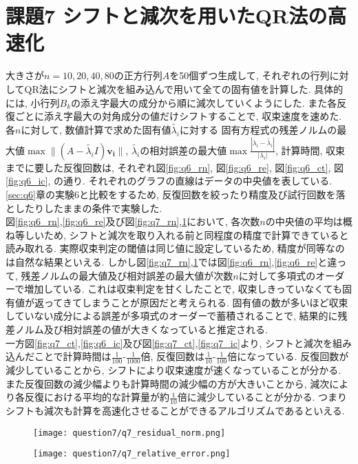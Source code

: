 \documentclass[uplatex,a4j]{jsarticle}
\begin{document}
\section{課題7 シフトと減次を用いたQR法の高速化}
\label{sec:q7}
大きさが$n = 10,20,40,80$の正方行列$A$を50個ずつ生成して, 
それぞれの行列に対してQR法にシフトと減次を組み込んで用いて全ての固有値を計算した. 
具体的には, 小行列$B_k$の添え字最大の成分から順に減次していくようにした. 
また各反復ごとに添え字最大の対角成分の値だけシフトすることで, 収束速度を速めた. \\
各$n$に対して, 数値計算で求めた固有値$\tilde{\lambda_i}$に対する
固有方程式の残差ノルムの最大値$\max{\| (A - \tilde{\lambda_i}I) \bm{v_i} \| }$, 
$\tilde{\lambda_i}$の相対誤差の最大値$\max{\frac{|\lambda_i - \tilde{\lambda_i}|}{|\lambda_i|}}$, 
計算時間, 収束までに要した反復回数は, 
それぞれ図\ref{fig:q6_rn}, 図\ref{fig:q6_re}, 図\ref{fig:q6_ct}, 図\ref{fig:q6_ic}, の通り. 
それぞれのグラフの直線はデータの中央値を表している. \\
\ref{sec:q6}章の実験6と比較をするため, 
反復回数を絞ったり精度及び試行回数を落としたりしたままの条件で実験した. \\
図\ref{fig:q6_rn},\ref{fig:q6_re}及び図\ref{fig:q7_rn},\ref{fig:q7_re}において, 
各次数$n$の中央値の平均は概ね等しいため, シフトと減次を取り入れる前と同程度の精度で計算できていると読み取れる. 
実際収束判定の閾値は同じ値に設定しているため, 精度が同等なのは自然な結果といえる. 
しかし図\ref{fig:q7_rn},\ref{fig:q7_re}では図\ref{fig:q6_rn},\ref{fig:q6_re}と違って, 
残差ノルムの最大値及び相対誤差の最大値が次数$n$に対して多項式のオーダーで増加している. 
これは収束判定を甘くしたことで, 収束しきっていなくても固有値が返ってきてしまうことが原因だと考えられる. 
固有値の数が多いほど収束していない成分による誤差が多項式のオーダーで蓄積されることで, 
結果的に残差ノルム及び相対誤差の値が大きくなっていると推定される. \\
一方図\ref{fig:q7_ct},\ref{fig:q6_ic}及び図\ref{fig:q7_ct},\ref{fig:q7_ic}より, 
シフトと減次を組み込んだことで計算時間は$\frac{1}{100}$-$\frac{1}{1000}$倍, 
反復回数は$\frac{1}{10}$-$\frac{1}{100}$倍になっている. 
反復回数が減少していることから, シフトにより収束速度が速くなっていることが分かる. 
また反復回数の減少幅よりも計算時間の減少幅の方が大きいことから, 
減次により各反復における平均的な計算量が約$\frac{1}{10}$倍に減少していることが分かる. 
つまりシフトも減次も計算を高速化させることができるアルゴリズムであるといえる. 


\begin{figure}[htbp]
  \centering

  \begin{minipage}[t]{0.48\textwidth}
    \centering
    \texttt{[image: question7/q7\_residual\_norm.png]}
    \label{fig:q7_rn}
  \end{minipage}
  \hfill
  \begin{minipage}[t]{0.48\textwidth}
    \centering
    \texttt{[image: question7/q7\_relative\_error.png]}
    \label{fig:q7_re}
  \end{minipage}
  
\end{figure}
\end{document}
